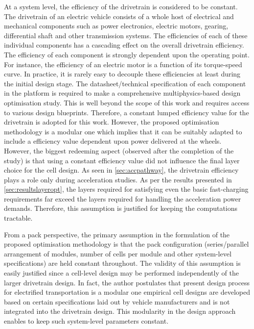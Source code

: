 At  a  system level,  the  efficiency  of the  drivetrain  is  considered to  be
constant. The  drivetrain of  an electric  vehicle consists of  a whole  host of
electrical and mechanical components such as power electronics, electric motors,
gearing, differential shaft and other  transmission systems. The efficiencies of
each  of these  individual  components has  a cascading  effect  on the  overall
drivetrain efficiency.  The efficiency of  each component is  strongly dependent
upon the operating point. For instance, the efficiency of an electric motor is a
function  of  its  torque-speed  curve.  In  practice,  it  is  rarely  easy  to
decouple  these efficiencies  at  least  during the  initial  design stage.  The
datasheet/technical specification of each component  in the platform is required
to make  a comprehensive multiphysics-based  design optimisation study.  This is
well  beyond the  scope  of this  work  and requires  access  to various  design
blueprints. Therefore, a constant lumped  efficiency value for the drivetrain is
adopted  for this  work. However,  the  proposed optimisation  methodology is  a
modular one  which implies that  it can be suitably  adapted \eg{} to  include a
efficiency  value dependent  upon power  delivered at  the wheels.  However, the
biggest redeeming  aspect (observed after the  completion of the study)  is that
using a constant  efficiency value did not influence the  final layer choice for
the cell  design. As  seen in  \cref{sec:accpathway}, the  drivetrain efficiency
plays a role  only during acceleration studies. As per  the results presented in
\cref{sec:resultslayeropt}, the  layers required  for satisfying even  the basic
fast-charging  requirements far  exceed  the layers  required  for handling  the
acceleration power demands. Therefore, this  assumption is justified for keeping
the computations tractable.

From  a  pack  perspective,  the   primary  assumption  in  the  formulation  of
the   proposed  optimisation   methodology  is   that  the   pack  configuration
(series/parallel arrangement  of modules, number  of cells per module  and other
system-level specifications) are held constant  throughout. The validity of this
assumption  is easily  justified  since  a cell-level  design  may be  performed
independently of  the larger drivetrain  design. In fact, the  author postulates
that  present design  process for  electrified transportation  is a  modular one
\ie{} empirical cell designs are  developed based on certain specifications laid
out by vehicle  manufacturers and is not integrated into  the drivetrain design.
This  modularity  in the  design  approach  enables  to keep  such  system-level
parameters constant.


